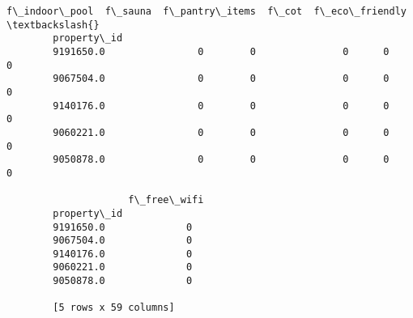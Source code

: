 \documentclass[11pt]{article}
\begin{document}
\begin{Verbatim}[commandchars=\\\{\}]
                     f\_indoor\_pool  f\_sauna  f\_pantry\_items  f\_cot  f\_eco\_friendly  \textbackslash{}
        property\_id                                                                  
        9191650.0                0        0               0      0               0   
        9067504.0                0        0               0      0               0   
        9140176.0                0        0               0      0               0   
        9060221.0                0        0               0      0               0   
        9050878.0                0        0               0      0               0   
        
                     f\_free\_wifi  
        property\_id               
        9191650.0              0  
        9067504.0              0  
        9140176.0              0  
        9060221.0              0  
        9050878.0              0  
        
        [5 rows x 59 columns]
\end{Verbatim}
            
\end{document}
